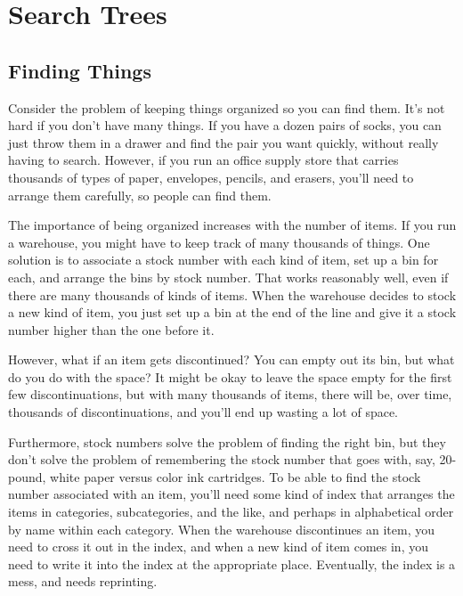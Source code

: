 \chapter{Search Trees}
\label{ch:search-trees}

\section{Finding Things}

Consider the problem of keeping things organized so you can find them.
It's not hard if you don't have many things.
If you have a dozen pairs of socks, you can just throw them in a drawer
and find the pair you want quickly, without really having to search.
However, if you run an office supply store that carries thousands of
types of paper, envelopes, pencils, and erasers,
you'll need to arrange them carefully, so people can find them.

The importance of being organized increases with the number of items.
If you run a warehouse, you might have to keep track of many thousands of things.
One solution is to associate a stock number with each
kind of item, set up a bin for each, and arrange the bins by
stock number.
That works reasonably well, even if there are many thousands of kinds of items.
When the warehouse decides to stock a new kind of item, you just set up
a bin at the end of the line and give it a stock number higher than the
one before it.

However, what if an item gets discontinued?
You can empty out its bin, but what do you do with the space?
It might be okay to leave the space empty for the first few discontinuations,
but with many thousands of items, there will be, over time, thousands
of discontinuations, and you'll end up wasting a lot of space.

Furthermore, stock numbers solve the problem of finding the
right bin, but they don't solve the problem of remembering the stock number
that goes with, say, 20-pound, white paper versus color ink cartridges.
To be able to find the stock number associated with
an item, you'll need some kind of index that arranges the items in
categories, subcategories, and the like, and perhaps in alphabetical
order by name within each category.
When the warehouse discontinues an item,
you need to cross it out in the index,
and when a new kind of item comes in, you need to write it into
the index at the appropriate place.
Eventually, the index is a mess, and needs reprinting.

